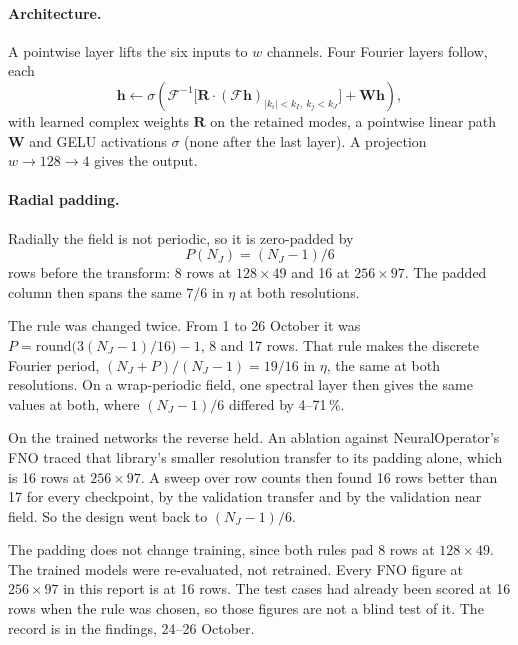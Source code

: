 \documentclass[11pt]{article}
\begin{document}
\paragraph{Architecture.}
A pointwise layer lifts the six inputs to $w$ channels. Four Fourier layers follow, each
\begin{equation}
  \bm h \leftarrow \sigma\!\left(\mathcal F^{-1}\!\bigl[\bm R\cdot(\mathcal F\bm h)_{|k_i|<k_I,\ k_j<k_J}\bigr]
  + \bm W\bm h\right),
\end{equation}
with learned complex weights $\bm R$ on the retained modes, a pointwise linear path $\bm W$ and GELU
activations $\sigma$ (none after the last layer). A projection $w\to128\to4$ gives the output.

\paragraph{Radial padding.}
Radially the field is not periodic, so it is zero-padded by
\begin{equation}
  P(N_J) = (N_J-1)/6
\end{equation}
rows before the transform: 8 rows at $128\times49$ and 16 at $256\times97$. The padded column
then spans the same $7/6$ in $\eta$ at both resolutions.

The rule was changed twice. From 1 to 26 October it was
$P = \mathrm{round}\bigl(3(N_J-1)/16\bigr) - 1$, 8 and 17 rows. That rule makes the discrete
Fourier period, $(N_J+P)/(N_J-1) = 19/16$ in $\eta$, the same at both resolutions. On a
wrap-periodic field, one spectral layer then gives the same values at both, where $(N_J-1)/6$
differed by 4--71\,\%.

On the trained networks the reverse held. An ablation against NeuralOperator's FNO traced that
library's smaller resolution transfer to its padding alone, which is 16 rows at $256\times97$.
A sweep over row counts then found 16 rows better than 17 for every checkpoint, by the validation
transfer and by the validation near field. So the design went back to $(N_J-1)/6$.

The padding does not change training, since both rules pad 8 rows at $128\times49$. The trained
models were re-evaluated, not retrained. Every FNO figure at $256\times97$ in this report is at
16 rows. The test cases had already been scored at 16 rows when the rule was chosen, so those
figures are not a blind test of it. The record is in the findings, 24--26 October.
\end{document}
